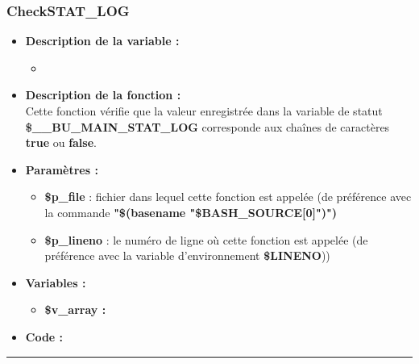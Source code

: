 \documentclass[a4paper,10pt]{article}
\begin{document}
\subsubsection{CheckSTAT\_LOG}\color{white}
\begin{itemize}
    \item \textbf{Description de la variable :}
    \begin{itemize}
        \item \textbf{}\\[1\baselineskip]
    \end{itemize}


    \item \textbf{Description de la fonction :}\\
        Cette fonction vérifie que la valeur enregistrée dans la variable de statut \textbf{\color{orange}\$\_\_BU\_MAIN\_STAT\_LOG} corresponde aux chaînes de caractères \textbf{true} ou \textbf{false}.\\[1\baselineskip]

    \item \textbf{Paramètres :}
    \begin{itemize}
        \item \color{orange}\textbf{\$p\_file}\color{white} : fichier dans lequel cette fonction est appelée (de préférence avec la commande \textbf{"\$(\color{gray}basename \color{white}"\color{orange}\$BASH\_SOURCE[0]\color{white}")")}\\[1\baselineskip]

        \item \color{orange}\textbf{\$p\_lineno}\color{white} : le numéro de ligne où cette fonction est appelée (de préférence avec la variable d'environnement \textbf{\color{orange}\$LINENO}))\\[1\baselineskip]
    \end{itemize}

    \item \textbf{Variables :}
    \begin{itemize}
        \item \textbf{\color{orange}\$v\_array\color{white} :}\\[1\baselineskip]
    \end{itemize}


    \item \textbf{Code :}
\end{itemize}



\color{blue}\par\noindent\rule{\textwidth}{0.4pt}\color{white}
\end{document}
